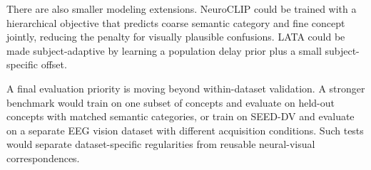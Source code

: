 \documentclass{article}
\begin{document}
There are also smaller modeling extensions. NeuroCLIP could be trained with a
hierarchical objective that predicts coarse semantic category and fine concept
jointly, reducing the penalty for visually plausible confusions. LATA could be
made subject-adaptive by learning a population delay prior plus a small
subject-specific offset.

A final evaluation priority is moving beyond within-dataset validation. A
stronger benchmark would train on one subset of concepts and evaluate on held-out
concepts with matched semantic categories, or train on SEED-DV and evaluate on a
separate EEG vision dataset with different acquisition conditions. Such tests
would separate dataset-specific regularities from reusable neural-visual
correspondences.



\end{document}
